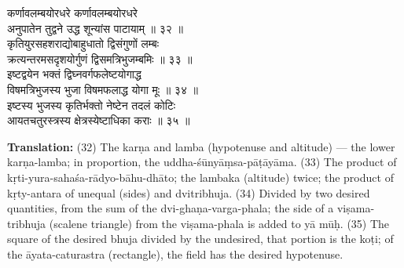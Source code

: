 \documentclass[11pt,a4paper]{article}
\newcommand{\dev}[1]{{\devanagarifont #1}}
\newcommand{\sanskritcol}[1]{%
  \begin{minipage}[t]{0.47\textwidth}
  \vspace{0pt}
  \begin{flushleft}
  #1
  \end{flushleft}
  \end{minipage}%
  \hfill
}
\newcommand{\englishcol}[1]{%
  \begin{minipage}[t]{0.47\textwidth}
  \vspace{0pt}
  \begin{flushleft}
  #1
  \end{flushleft}
  \end{minipage}%
}
\begin{document}
\noindent
\sanskritcol{\dev{कर्णावलम्बयोरधरे कर्णावलम्बयोरधरे} \\ \dev{अनुपातेन तुद्वने उद्ध शून्यांस पाटायाम् ॥ ३२ ॥} \\[0.2cm]
\dev{कृतियुरसहशराद्योबाहुधातो द्विसंगुणों लम्बः} \\ \dev{क्रत्यन्तरमसदृशयोर्गुणं द्विसमत्रिभुजम्बमिः ॥ ३३ ॥} \\[0.2cm]
\dev{इष्टद्वयेन भक्तं द्विघ्नवर्गफलेष्टयोगाद्ध} \\ \dev{विषमत्रिभुजस्य भुजा विषमफलाद्ध योगा मूः ॥ ३४ ॥} \\[0.2cm]
\dev{इष्टस्य भुजस्य कृतिर्भक्तो नेष्टेन तदलं कोटिः} \\ \dev{आयतचतुरस्त्रस्य क्षेत्रस्येष्टाधिका कराः ॥ ३५ ॥}}
\englishcol{\textbf{Translation:} (32) The karṇa and lamba (hypotenuse and altitude) --- the lower
karṇa-lamba; in proportion, the uddha-śūnyāṃsa-pāṭāyāma. (33) The product of
kṛti-yura-sahaśa-rādyo-bāhu-dhāto; the lambaka (altitude) twice; the product of
kṛty-antara of unequal (sides) and dvitribhuja. (34) Divided by two desired quantities,
from the sum of the dvi-ghaṇa-varga-phala; the side of a viṣama-tribhuja (scalene
triangle) from the viṣama-phala is added to yā mūḥ. (35) The square of the desired
bhuja divided by the undesired, that portion is the koṭi; of the āyata-caturastra
(rectangle), the field has the desired hypotenuse.}
\end{document}
